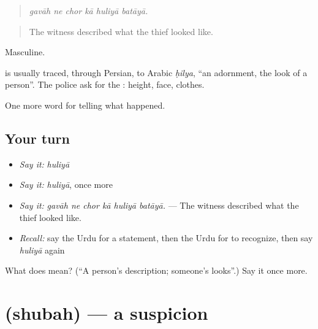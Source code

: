 \begin{quote}
     
\end{quote}

\begin{quote}
\emph{gavāh ne chor kā huliyā batāyā.}
\end{quote}

\begin{quote}
The witness described what the thief looked like.
\end{quote}

Masculine.

\begin{cousinweb}
is usually traced, through Persian, to Arabic \emph{ḥilya}, \textquotedblleft{}an adornment, the look of a person\textquotedblright{}. The police ask for the \textbf{}: height, face, clothes.
\end{cousinweb}

\begin{grammarlens}[title={What you've built}]
One more word for telling what happened.
\end{grammarlens}

\subsection*{Your turn}
\begin{itemize}
\raggedright
  \item \emph{Say it:} \emph{huliyā}
  \item \emph{Say it:} \emph{huliyā}, once more
  \item \emph{Say it:} \emph{gavāh ne chor kā huliyā batāyā.} — The witness described what the thief looked like.
  \item \emph{Recall:} say the Urdu for a statement, then the Urdu for to recognize, then say \emph{huliyā} again
\end{itemize}

\begin{tcolorbox}[breakable,colback=teal!4,colframe=teal!35!black,title={Before you move on}]
What does  mean? (\textquotedblleft{}A person's description; someone's looks\textquotedblright{}.) Say it once more.
\end{tcolorbox}
\section[\texorpdfstring{\ur{شبہ} (shubah)}{شبہ (shubah)}]{ (shubah) — a suspicion}

